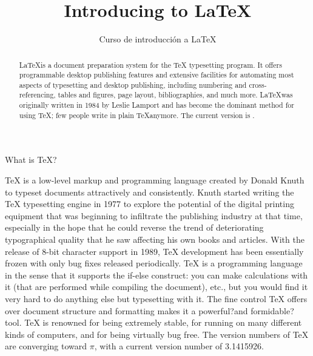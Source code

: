 \documentclass[10pt,letterpaper]{article}
\title{Introducing to \LaTeX}
\author{Curso de introducción a LaTeX}
\begin{document}
  \maketitle  
  \begin{abstract}
  \LaTeX is a document preparation system for the \TeX
  typesetting program. It offers programmable desktop publishing features and extensive facilities for automating most aspects of
  typesetting and desktop publishing, including numbering and
  cross-referencing, tables and figures, page layout, bibliographies,
  and much more. \LaTeX was originally written in 1984 by Leslie
  Lamport and has become the dominant method for using \TeX; few
  people write in plain \TeX anymore. The current version is
  \LaTeXe.
  \end{abstract}
What is TeX?

TeX is a low-level markup and programming language created by Donald Knuth to typeset documents attractively and consistently. Knuth started writing the TeX typesetting engine in 1977 to explore the potential of the digital printing equipment that was beginning to infiltrate the publishing industry at that time, especially in the hope that he could reverse the trend of deteriorating typographical quality that he saw affecting his own books and articles. With the release of 8-bit character support in 1989, TeX development has been essentially frozen with only bug fixes released periodically. TeX is a programming language in the sense that it supports the if-else construct: you can make calculations with it (that are performed while compiling the document), etc., but you would find it very hard to do anything else but typesetting with it. The fine control TeX offers over document structure and formatting makes it a powerful?and formidable?tool. TeX is renowned for being extremely stable, for running on many different kinds of computers, and for being virtually bug free. The version numbers of TeX are converging toward $\pi$, with a current version number of 3.1415926.
\end{document}
